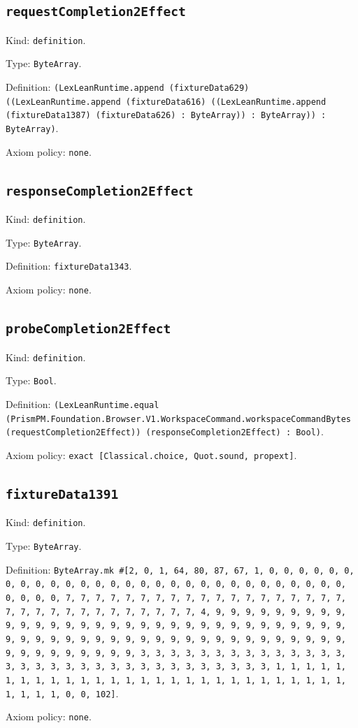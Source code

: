 \documentclass[11pt]{article}
\begin{document}
\subsection*{\texttt{requestCompletion2Effect}}
\noindent Kind: \texttt{definition}.\par
\noindent Type: \texttt{ByteArray}.\par
\noindent Definition: \texttt{(LexLeanRuntime.append (fixtureData629) ((LexLeanRuntime.append (fixtureData616) ((LexLeanRuntime.append (fixtureData1387) (fixtureData626) : ByteArray)) : ByteArray)) : ByteArray)}.\par
\noindent Axiom policy: \texttt{none}.\par
\subsection*{\texttt{responseCompletion2Effect}}
\noindent Kind: \texttt{definition}.\par
\noindent Type: \texttt{ByteArray}.\par
\noindent Definition: \texttt{fixtureData1343}.\par
\noindent Axiom policy: \texttt{none}.\par
\subsection*{\texttt{probeCompletion2Effect}}
\noindent Kind: \texttt{definition}.\par
\noindent Type: \texttt{Bool}.\par
\noindent Definition: \texttt{(LexLeanRuntime.equal (PrismPM.Foundation.Browser.V1.WorkspaceCommand.workspaceCommandBytes (requestCompletion2Effect)) (responseCompletion2Effect) : Bool)}.\par
\noindent Axiom policy: \texttt{exact [Classical.choice, Quot.sound, propext]}.\par
\subsection*{\texttt{fixtureData1391}}
\noindent Kind: \texttt{definition}.\par
\noindent Type: \texttt{ByteArray}.\par
\noindent Definition: \texttt{ByteArray.mk \#[2, 0, 1, 64, 80, 87, 67, 1, 0, 0, 0, 0, 0, 0, 0, 0, 0, 0, 0, 0, 0, 0, 0, 0, 0, 0, 0, 0, 0, 0, 0, 0, 0, 0, 0, 0, 0, 0, 0, 0, 0, 7, 7, 7, 7, 7, 7, 7, 7, 7, 7, 7, 7, 7, 7, 7, 7, 7, 7, 7, 7, 7, 7, 7, 7, 7, 7, 7, 7, 7, 7, 7, 7, 4, 9, 9, 9, 9, 9, 9, 9, 9, 9, 9, 9, 9, 9, 9, 9, 9, 9, 9, 9, 9, 9, 9, 9, 9, 9, 9, 9, 9, 9, 9, 9, 9, 9, 9, 9, 9, 9, 9, 9, 9, 9, 9, 9, 9, 9, 9, 9, 9, 9, 9, 9, 9, 9, 9, 9, 9, 9, 9, 9, 9, 9, 9, 9, 9, 3, 3, 3, 3, 3, 3, 3, 3, 3, 3, 3, 3, 3, 3, 3, 3, 3, 3, 3, 3, 3, 3, 3, 3, 3, 3, 3, 3, 3, 3, 3, 3, 1, 1, 1, 1, 1, 1, 1, 1, 1, 1, 1, 1, 1, 1, 1, 1, 1, 1, 1, 1, 1, 1, 1, 1, 1, 1, 1, 1, 1, 1, 1, 1, 0, 0, 102]}.\par
\noindent Axiom policy: \texttt{none}.\par
\end{document}
